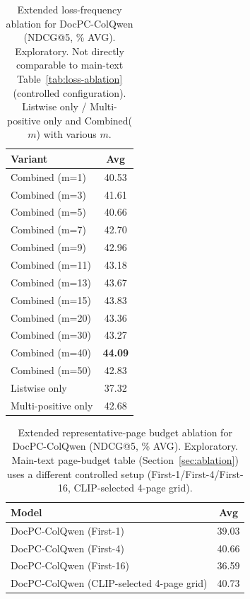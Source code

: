 \begin{table}[htbp]
  \centering
  \footnotesize
  \caption{Extended loss-frequency ablation for DocPC-ColQwen (NDCG@5, \% AVG). Exploratory. Not directly comparable to main-text Table~\ref{tab:loss-ablation} (controlled configuration). Listwise only / Multi-positive only and Combined($m$) with various $m$.}
  \label{tab:app-a6}
  \begin{tabular}{@{}lc@{}}
    \toprule
    Variant & Avg \\
    \midrule
    Combined (m=1) & 40.53 \\
    Combined (m=3) & 41.61 \\
    Combined (m=5) & 40.66 \\
    Combined (m=7) & 42.70 \\
    Combined (m=9) & 42.96 \\
    Combined (m=11) & 43.18 \\
    Combined (m=13) & 43.67 \\
    Combined (m=15) & 43.83 \\
    Combined (m=20) & 43.36 \\
    Combined (m=30) & 43.27 \\
    Combined (m=40) & \textbf{44.09} \\
    Combined (m=50) & 42.83 \\
    Listwise only & 37.32 \\
    Multi-positive only & 42.68 \\
    \bottomrule
  \end{tabular}
\end{table}

\begin{table}[htbp]
  \centering
  \footnotesize
  \caption{Extended representative-page budget ablation for DocPC-ColQwen (NDCG@5, \% AVG). Exploratory. Main-text page-budget table (Section~\ref{sec:ablation}) uses a different controlled setup (First-1/First-4/First-16, CLIP-selected 4-page grid).}
  \label{tab:app-a7}
  \begin{tabular}{@{}lc@{}}
    \toprule
    Model & Avg \\
    \midrule
    DocPC-ColQwen (First-1) & 39.03 \\
    DocPC-ColQwen (First-4) & 40.66 \\
    DocPC-ColQwen (First-16) & 36.59 \\
    DocPC-ColQwen (CLIP-selected 4-page grid) & 40.73 \\
    \bottomrule
  \end{tabular}
\end{table}

